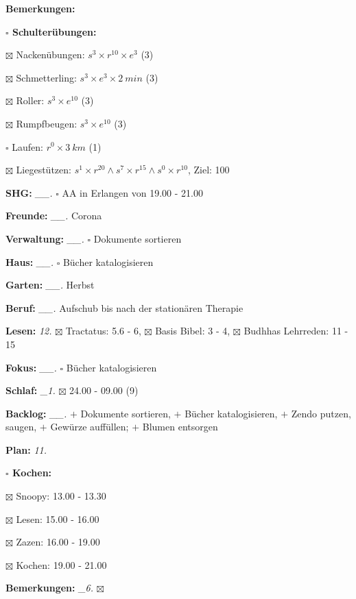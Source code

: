\documentclass[10pt,a4paper]{article}
\newcommand\prop[1] {{\color {alizarin} {\bf #1}}}             %
\newcommand\mand[1] {{\color {burntorange} {\bf #1}}}          %
\newcommand\topspace{\vskip -15pt \hskip 20pt}
\newcommand\bottomspace{\vskip 4pt}
\newcommand\n[1] { {\sl #1.} \hskip 5pt }
\begin{document}
\begin{mdframed}[style=daystyle]
\begin{labeling}{{\mand {Bemerkungen:}}}
\begin{minipage}{0.75\textwidth}
\begin{labeling}{\prop {$\square$ {Schulterübungen:}}}
      \item[$\boxtimes$ Nackenübungen:]   $s^3 \times r^{10} \times e^3$ (3)
      \item[$\boxtimes$ Schmetterling:]   $s^3 \times e^3 \times 2\ min$ (3)
      \item[$\boxtimes$ Roller:]          $s^3 \times e^{10}$ (3)
      \item[$\boxtimes$ Rumpfbeugen:]     $s^3 \times e^{10}$ (3)
      \item[$\square$ Laufen:]          $r^0 \times 3\ km$ (1)
      \item[$\boxtimes$ Liegestützen:]    $s^1 \times r^{20} \land s^7 \times r^{15} \land s^0 \times r^{10}$, Ziel: 100
      \end{labeling}
    \end{minipage}
    \bottomspace        
  \item[{\mand {SHG:}}]          \n{\_\_} $\square$ AA in Erlangen von 19.00 - 21.00
  \item[{\mand {Freunde:}}]      \n{\_\_} Corona
  \item[{\mand {Verwaltung:}}]   \n{\_\_} $\square$ Dokumente sortieren
  \item[{\mand {Haus:}}]         \n{\_\_} $\square$ Bücher katalogisieren
  \item[{\mand {Garten:}}]       \n{\_\_} Herbst
  \item[{\mand {Beruf:}}]        \n{\_\_} Aufschub bis nach der stationären Therapie
  \item[{\mand {Lesen:}}]          \n{12} $\boxtimes$ Tractatus: 5.6 - 6, $\boxtimes$ Basis Bibel: 3 - 4,
      $\boxtimes$ Budhhas Lehrreden: 11 - 15
  \item[{\mand {Fokus:}}]        \n{\_\_} $\square$ Bücher katalogisieren
  \item[{\mand {Schlaf:}}]        \n{\_1} $\boxtimes$ 24.00 - 09.00 (9)
  \item[{\mand {Backlog:}}]      \n{\_\_}
    $+$ Dokumente sortieren, $+$ Bücher katalogisieren,
    $+$ Zendo putzen, saugen, $+$ Gewürze auffüllen; $+$ Blumen entsorgen
  \item[{\mand {Plan:}}]           \n{11}
    \topspace
    \begin{minipage}{0.75\textwidth}  
      \begin{labeling}{\prop {$\square$ {Kochen:}}} 
        \setlength\itemsep{-3pt}
      \item[$\boxtimes$ Snoopy:] 13.00 - 13.30
      \item[$\boxtimes$ Lesen:]  15.00 - 16.00        
      \item[$\boxtimes$ Zazen:]  16.00 - 19.00
      \item[$\boxtimes$ Kochen:] 19.00 - 21.00
      \end{labeling}
    \end{minipage}
    \bottomspace
  \item[{\mand {Bemerkungen:}}]  \n{\_6} $\boxtimes$
  \end{labeling}
    

\end{mdframed}
\end{document}
